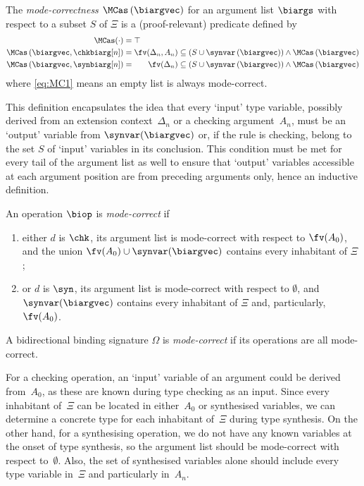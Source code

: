 \begin{definition}\label{def:mode-correctness-args}
  The \emph{mode-correctness} $\MCas\left(\biargvec\right)$ for an argument list $\biargs$ with respect to a subset $S$ of $\Xi$ is a (proof-relevant) predicate defined by
  \begin{align}
    \label{eq:MC1} \MCas( \cdot ) & = \top \\
    \label{eq:MC3} \MCas\left(\biargvec, \chkbiarg[n]\right)
                                  & = \fv(\Delta_n, A_n) \subseteq \left( S \cup \synvar\left(\biargvec\right)\right) \land \MCas\left(\biargvec\right) \\
    \label{eq:MC2} \MCas\left(\biargvec, \synbiarg[n]\right) 
                                  & = \phantom{, A_n} \fv(\Delta_n) \subseteq \left( S \cup \synvar\left(\biargvec\right)\right) \land  \MCas\left(\biargvec\right)
  \end{align}
  where \eqref{eq:MC1} means an empty list is always mode-correct.
\end{definition}
This definition encapsulates the idea that every `input' type variable, possibly derived from an extension context~$\Delta_n$ or a checking argument~$A_n$, must be an `output' variable from $\synvar(\biargvec)$ or, if the rule is checking, belong to the set $S$ of `input' variables in its conclusion.
This condition must be met for every tail of the argument list as well to ensure that `output' variables accessible at each argument position are from preceding arguments only, hence an inductive definition.
\begin{definition}\label{def:mode-correctness}
  An operation $\biop$ is \emph{mode-correct} if 
  \begin{enumerate}
    \item either $d$ is $\chk$, its argument list is mode-correct with respect to $\fv(A_0)$, and the union $\fv(A_0) \cup \synvar(\biargvec)$ contains every inhabitant of $\Xi$;
    \item or $d$ is $\syn$, its argument list is mode-correct with respect to $\emptyset$, and $\synvar(\biargvec)$ contains every inhabitant of $\Xi$ and, particularly, $\fv(A_0)$.
  \end{enumerate}
  A bidirectional binding signature $\Omega$ is \emph{mode-correct} if its operations are all mode-correct.
\end{definition}
For a checking operation, an `input' variable of an argument could be derived from~$A_0$, as these are known during type checking as an input.
Since every inhabitant of~$\Xi$ can be located in either~$A_0$ or synthesised variables, we can determine a concrete type for each inhabitant of~$\Xi$ during type synthesis.
On the other hand, for a synthesising operation, we do not have any known variables at the onset of type synthesis, so the argument list should be mode-correct with respect to~$\emptyset$.
Also, the set of synthesised variables alone should include every type variable in~$\Xi$ and particularly in~$A_n$.

